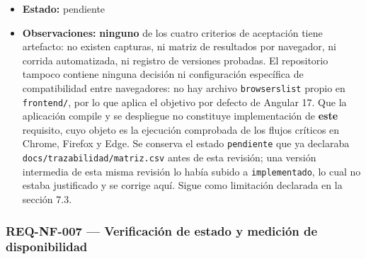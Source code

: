 \documentclass[
  spanish,
]{article}
\begin{document}
\begin{itemize}
  que aplica el objetivo por defecto de Angular 17.
\item
  \textbf{Estado:} pendiente
\item
  \textbf{Observaciones:} \textbf{ninguno} de los cuatro criterios de
  aceptación tiene artefacto: no existen capturas, ni matriz de
  resultados por navegador, ni corrida automatizada, ni registro de
  versiones probadas. El repositorio tampoco contiene ninguna decisión
  ni configuración específica de compatibilidad entre navegadores: no
  hay archivo \texttt{browserslist} propio en \texttt{frontend/}, por lo
  que aplica el objetivo por defecto de Angular 17. Que la aplicación
  compile y se despliegue no constituye implementación de \textbf{este}
  requisito, cuyo objeto es la ejecución comprobada de los flujos
  críticos en Chrome, Firefox y Edge. Se conserva el estado
  \texttt{pendiente} que ya declaraba
  \texttt{docs/\allowbreak{}trazabilidad/\allowbreak{}matriz.\allowbreak{}csv} antes de esta revisión; una
  versión intermedia de esta misma revisión lo había subido a
  \texttt{implementado}, lo cual no estaba justificado y se corrige
  aquí. Sigue como limitación declarada en la sección 7.3.
\end{itemize}

\subsubsection{REQ-NF-007 --- Verificación de estado y medición de
disponibilidad}\label{req-nf-007-verificaciuxf3n-de-estado-y-mediciuxf3n-de-disponibilidad}
\end{document}
